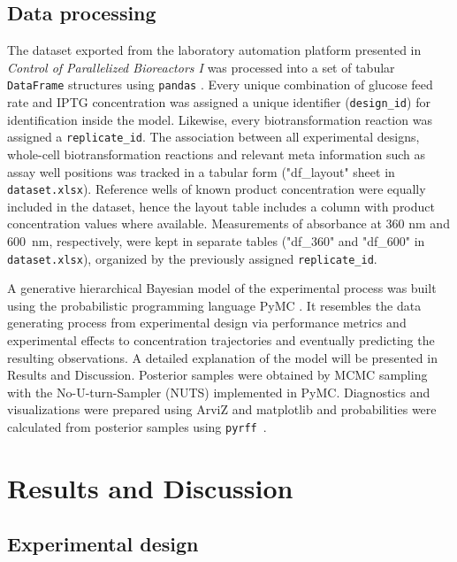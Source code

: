 \documentclass[sn-standardnature]{sn-jnl}%
\theoremstyle{thmstyleone}%
\theoremstyle{thmstyletwo}%
\theoremstyle{thmstylethree}%
\begin{document}
\subsection{Data processing}
\label{sec_mm_computational}

The dataset exported from the laboratory automation platform presented in \textit{Control of Parallelized Bioreactors I} \cite{controlOfParallelizedBioreactorsI} was processed into a set of tabular \texttt{DataFrame} structures using \texttt{pandas} \cite{pandasSoftware,pandasPaper}.
Every unique combination of glucose feed rate and IPTG concentration was assigned a unique identifier (\texttt{design\_id}) for identification inside the model.
Likewise, every biotransformation reaction was assigned a \texttt{replicate\_id}.
The association between all experimental designs, whole-cell biotransformation reactions and relevant meta information such as assay well positions was tracked in a tabular form ("df\_layout" sheet in \texttt{dataset.xlsx}).
Reference wells of known product concentration were equally included in the dataset, hence the layout table includes a column with product concentration values where available.
Measurements of absorbance at 360 nm and 600~nm, respectively, were kept in separate tables ("df\_360" and "df\_600" in \texttt{dataset.xlsx}), organized by the previously assigned \texttt{replicate\_id}.

A generative hierarchical Bayesian model of the experimental process was built using the probabilistic programming language PyMC \cite{pymc3,pymcZenodo}.
It resembles the data generating process from experimental design via performance metrics and experimental effects to concentration trajectories and eventually predicting the resulting observations.
A detailed explanation of the model will be presented in Results and Discussion.
Posterior samples were obtained by MCMC sampling with the No-U-turn-Sampler (NUTS) implemented in PyMC.
Diagnostics and visualizations were prepared using ArviZ and matplotlib \cite{arviz,arvizPaper,matplotlib,matplotlibPaper} and probabilities were calculated from posterior samples using \texttt{pyrff}~\cite{pyrff}.



\section{Results and Discussion}
\label{sec_results}

\subsection{Experimental design}
\end{document}

